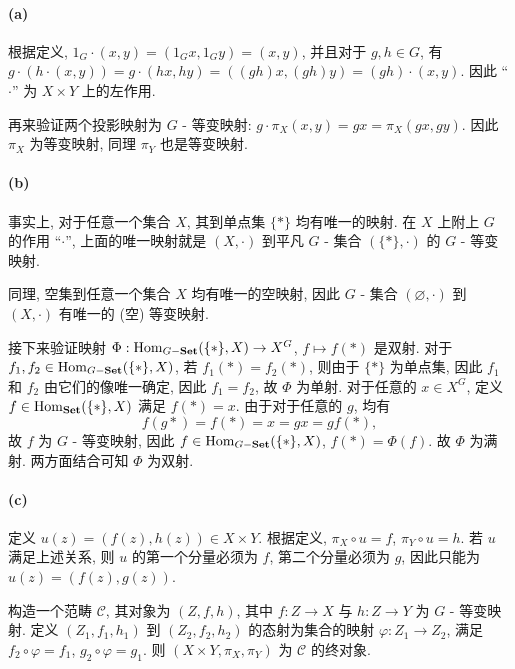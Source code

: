 \documentclass{article}
\begin{document}
\begin{solution}
	\paragraph{(a)} 根据定义, $1_G \cdot (x,y) = (1_G x, 1_G y) = (x,y)$, 并且对于 $g, h \in G$, 有 $g\cdot (h \cdot(x,y)) = g \cdot (hx, hy) = ((gh)x, (gh)y) = (gh) \cdot (x,y)$. 因此 ``$\cdot$'' 为 $X \times Y$ 上的左作用. 

	再来验证两个投影映射为 $G$ - 等变映射: $g \cdot \pi_X(x,y) = gx = \pi_X(gx, gy)$. 因此 $\pi_X$ 为等变映射, 同理 $\pi_Y$ 也是等变映射.

	\paragraph{(b)} 事实上, 对于任意一个集合 $X$, 其到单点集 $\{*\}$ 均有唯一的映射. 在 $X$ 上附上 $G$ 的作用 ``$\cdot$'', 上面的唯一映射就是 $(X,\cdot)$ 到平凡 $G$ - 集合 $(\{*\}, \cdot)$ 的 $G$ - 等变映射.

	同理, 空集到任意一个集合 $X$ 均有唯一的空映射, 因此 $G$ - 集合 $(\varnothing, \cdot)$ 到 $(X, \cdot)$ 有唯一的 (空) 等变映射. 

	接下来验证映射 $\Phi: \operatorname{Hom}_{G-\mathbf{Set}}(\{*\}, X) \to X^G$, $f \mapsto f(*)$ 是双射. 对于 $f_1, f_2 \in \operatorname{Hom}_{G-\mathbf{Set}}(\{*\}, X)$, 若 $f_1(*) = f_2(*)$, 则由于 $\{*\}$ 为单点集, 因此 $f_1$ 和 $f_2$ 由它们的像唯一确定, 因此 $f_1 = f_2$, 故 $\Phi$ 为单射. 对于任意的 $x \in X^G$, 定义 $f \in \operatorname{Hom}_{\mathbf{Set}}(\{*\}, X)$ 满足 $f(*) = x$. 由于对于任意的 $g$, 均有 
	\[ f(g*) = f(*) = x = gx = gf(*), \]
	故 $f$ 为 $G$ - 等变映射, 因此 $f \in \operatorname{Hom}_{G-\mathbf{Set}}(\{*\}, X)$, $f(*) = \Phi(f)$. 故 $\Phi$ 为满射. 两方面结合可知 $\Phi$ 为双射.

	\paragraph{(c)} 定义 $u(z) = (f(z), h(z)) \in X \times Y$. 根据定义, $\pi_X \circ u = f$, $\pi_Y \circ u = h$. 若 $u$ 满足上述关系, 则 $u$ 的第一个分量必须为 $f$, 第二个分量必须为 $g$, 因此只能为 $u(z) = (f(z), g(z))$. 

	构造一个范畴 $\mathcal{C}$, 其对象为 $(Z, f, h)$, 其中 $f: Z \to X$ 与 $h: Z \to Y$ 为 $G$ - 等变映射. 定义 $(Z_1, f_1, h_1)$ 到 $(Z_2, f_2, h_2)$ 的态射为集合的映射 $\varphi: Z_1 \to Z_2$, 满足 $f_2 \circ \varphi = f_1$, $g_2 \circ \varphi = g_1$. 则 $(X \times Y, \pi_X, \pi_Y)$ 为 $\mathcal{C}$ 的终对象. 
\end{solution}
\end{document}
